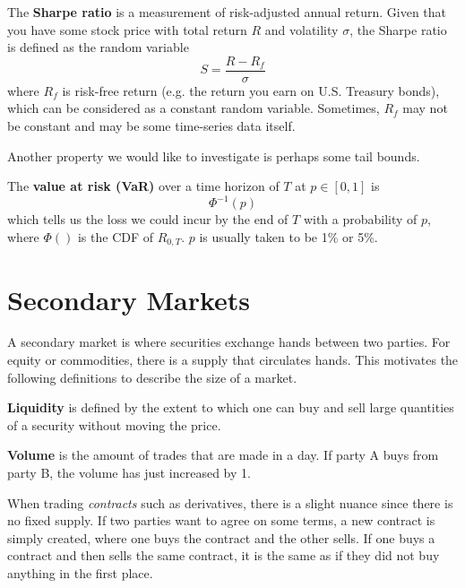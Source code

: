 \documentclass{article}
\begin{document}
    \begin{definition}
      The \textbf{Sharpe ratio} is a measurement of risk-adjusted annual return. Given that you have some stock price with total return $R$ and volatility $\sigma$, the Sharpe ratio is defined as the random variable
      \begin{equation}
        S = \frac{R - R_f}{\sigma}
      \end{equation}
      where $R_f$ is risk-free return (e.g. the return you earn on U.S. Treasury bonds), which can be considered as a constant random variable. Sometimes, $R_f$ may not be constant and may be some time-series data itself. 
    \end{definition}

    Another property we would like to investigate is perhaps some tail bounds. 

    \begin{definition}
      The \textbf{value at risk (VaR)} over a time horizon of $T$ at $p \in [0, 1]$ is 
      \begin{equation}
        \Phi^{-1}(p)
      \end{equation}
      which tells us the loss we could incur by the end of $T$ with a probability of $p$, where $\Phi()$ is the CDF of $R_{0, T}$. $p$ is usually taken to be 1\% or 5\%. 
    \end{definition}

\section{Secondary Markets}

    A secondary market is where securities exchange hands between two parties. For equity or commodities, there is a supply that circulates hands. This motivates the following definitions to describe the size of a market. 

    \begin{definition}[Liquidity]
      \textbf{Liquidity} is defined by the extent to which one can buy and sell large quantities of a security without moving the price. 
    \end{definition}

    \begin{definition}[Volume]
      \textbf{Volume} is the amount of trades that are made in a day. If party A buys from party B, the volume has just increased by 1. 
    \end{definition}

    When trading \textit{contracts} such as derivatives, there is a slight nuance since there is no fixed supply. If two parties want to agree on some terms, a new contract is simply created, where one buys the contract and the other sells. If one buys a contract and then sells the same contract, it is the same as if they did not buy anything in the first place. 
\end{document}

